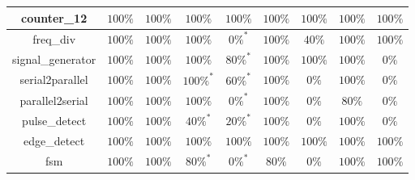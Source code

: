 \begin{tabular}{c|cc|cc|cc|cc}
counter\_12 & \color{black} {\cellcolor{lightblue}} $100\%$ & \color{black} {\cellcolor{lightgreen}} $100\%$ & \color{black} {\cellcolor{lightblue}} $100\%$ & \color{black} {\cellcolor{lightgreen}} $100\%$ & \color{black} {\cellcolor{lightblue}} $100\%$ & \color{black} {\cellcolor{lightgreen}} $100\%$ & \color{black} {\cellcolor{lightblue}} $100\%$ & \color{black} {\cellcolor{lightgreen}} $100\%$ \\ \midrule
freq\_div & \color{black} {\cellcolor{lightblue}} $100\%$ & \color{black} {\cellcolor{lightgreen}} $100\%$ & \color{black} {\cellcolor{lightblue}} $100\%$ & $0\%^*$ & \color{black} {\cellcolor{lightblue}} $100\%$ & $40\%$ & \color{black} {\cellcolor{lightblue}} $100\%$ & \color{black} {\cellcolor{lightgreen}} $100\%$ \\ \midrule
signal\_generator & \color{black} {\cellcolor{lightblue}} $100\%$ & \color{black} {\cellcolor{lightgreen}} $100\%$ & \color{black} {\cellcolor{lightblue}} $100\%$ & $80\%^*$ & \color{black} {\cellcolor{lightblue}} $100\%$ & \color{black} {\cellcolor{lightgreen}} $100\%$ & \color{black} {\cellcolor{lightblue}} $100\%$ & $0\%$ \\ \midrule
serial2parallel & \color{black} {\cellcolor{lightblue}} $100\%$ & \color{black} {\cellcolor{lightgreen}} $100\%$ & \color{black} {\cellcolor{lightblue}} $100\%^*$ & $60\%^*$ & \color{black} {\cellcolor{lightblue}} $100\%$ & $0\%$ & \color{black} {\cellcolor{lightblue}} $100\%$ & $0\%$ \\ \midrule
parallel2serial & \color{black} {\cellcolor{lightblue}} $100\%$ & \color{black} {\cellcolor{lightgreen}} $100\%$ & \color{black} {\cellcolor{lightblue}} $100\%$ & $0\%^*$ & \color{black} {\cellcolor{lightblue}} $100\%$ & $0\%$ & $80\%$ & $0\%$ \\ \midrule
pulse\_detect & \color{black} {\cellcolor{lightblue}} $100\%$ & \color{black} {\cellcolor{lightgreen}} $100\%$ & $40\%^*$ & $20\%^*$ & \color{black} {\cellcolor{lightblue}} $100\%$ & $0\%$ & \color{black} {\cellcolor{lightblue}} $100\%$ & $0\%$ \\ \midrule
edge\_detect & \color{black} {\cellcolor{lightblue}} $100\%$ & \color{black} {\cellcolor{lightgreen}} $100\%$ & \color{black} {\cellcolor{lightblue}} $100\%$ & \color{black} {\cellcolor{lightgreen}} $100\%$ & \color{black} {\cellcolor{lightblue}} $100\%$ & \color{black} {\cellcolor{lightgreen}} $100\%$ & \color{black} {\cellcolor{lightblue}} $100\%$ & \color{black} {\cellcolor{lightgreen}} $100\%$ \\ \midrule
fsm & \color{black} {\cellcolor{lightblue}} $100\%$ & \color{black} {\cellcolor{lightgreen}} $100\%$ & $80\%^*$ & $0\%^*$ & $80\%$ & $0\%$ & \color{black} {\cellcolor{lightblue}} $100\%$ & \color{black} {\cellcolor{lightgreen}} $100\%$ \\ \midrule

\end{tabular}
